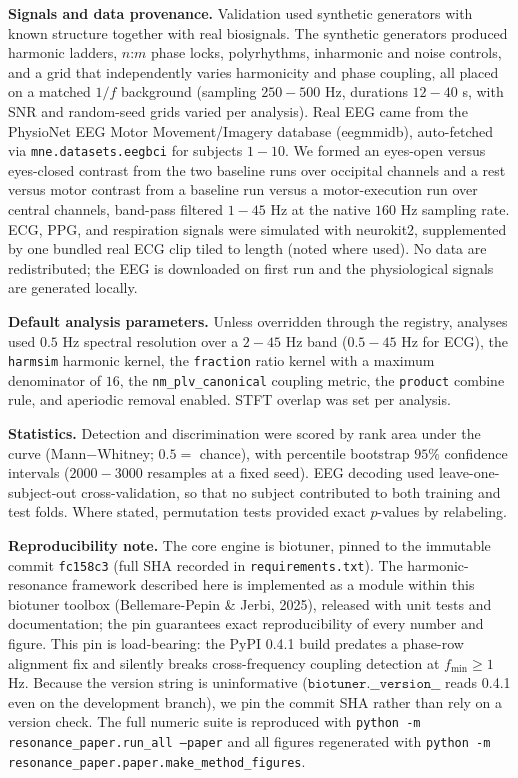 \documentclass[11pt]{article}
\begin{document}
\textbf{Signals and data provenance.} Validation used synthetic generators with known structure together with real biosignals. The synthetic generators produced harmonic ladders, $n$:$m$ phase locks, polyrhythms, inharmonic and noise controls, and a grid that independently varies harmonicity and phase coupling, all placed on a matched $1/f$ background (sampling $250-500$ Hz, durations $12-40$ s, with SNR and random-seed grids varied per analysis). Real EEG came from the PhysioNet EEG Motor Movement/Imagery database (eegmmidb), auto-fetched via \texttt{mne.datasets.eegbci} for subjects $1-10$. We formed an eyes-open versus eyes-closed contrast from the two baseline runs over occipital channels and a rest versus motor contrast from a baseline run versus a motor-execution run over central channels, band-pass filtered $1-45$ Hz at the native $160$ Hz sampling rate. ECG, PPG, and respiration signals were simulated with neurokit2, supplemented by one bundled real ECG clip tiled to length (noted where used). No data are redistributed; the EEG is downloaded on first run and the physiological signals are generated locally.

\textbf{Default analysis parameters.} Unless overridden through the registry, analyses used $0.5$ Hz spectral resolution over a $2-45$ Hz band ($0.5-45$ Hz for ECG), the \texttt{harmsim} harmonic kernel, the \texttt{fraction} ratio kernel with a maximum denominator of $16$, the \texttt{nm\_plv\_canonical} coupling metric, the \texttt{product} combine rule, and aperiodic removal enabled. STFT overlap was set per analysis.

\textbf{Statistics.} Detection and discrimination were scored by rank area under the curve (Mann$-$Whitney; $0.5 = $ chance), with percentile bootstrap $95\%$ confidence intervals ($2000-3000$ resamples at a fixed seed). EEG decoding used leave-one-subject-out cross-validation, so that no subject contributed to both training and test folds. Where stated, permutation tests provided exact $p$-values by relabeling.

\textbf{Reproducibility note.} The core engine is biotuner, pinned to the immutable commit \texttt{fc158c3} (full SHA recorded in \texttt{requirements.txt}). The harmonic-resonance framework described here is implemented as a module within this biotuner toolbox (Bellemare-Pepin \& Jerbi, 2025), released with unit tests and documentation; the pin guarantees exact reproducibility of every number and figure. This pin is load-bearing: the PyPI 0.4.1 build predates a phase-row alignment fix and silently breaks cross-frequency coupling detection at $f_{\min} \geq 1$ Hz. Because the version string is uninformative ($\texttt{biotuner.\_\_version\_\_}$ reads 0.4.1 even on the development branch), we pin the commit SHA rather than rely on a version check. The full numeric suite is reproduced with \texttt{python -m resonance\_paper.run\_all --paper} and all figures regenerated with \texttt{python -m resonance\_paper.paper.make\_method\_figures}.
\end{document}
